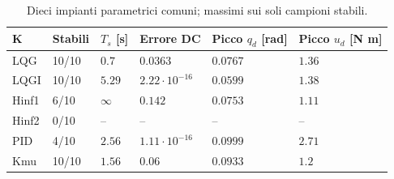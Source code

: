 \begin{table}[htbp]\centering\small
\begin{tabular}{llllll}\toprule
K & Stabili & $T_s$ [s] & Errore DC & Picco $q_d$ [rad] & Picco $u_d$ [N m]\\\midrule
LQG & 10/10 & $0.7$ & $0.0363$ & $0.0767$ & $1.36$\\
LQGI & 10/10 & $5.29$ & $2.22\cdot10^{-16}$ & $0.0599$ & $1.38$\\
Hinf1 & 6/10 & $\infty$ & $0.142$ & $0.0753$ & $1.11$\\
Hinf2 & 0/10 & -- & -- & -- & --\\
PID & 4/10 & $2.56$ & $1.11\cdot10^{-16}$ & $0.0999$ & $2.71$\\
Kmu & 10/10 & $1.56$ & $0.06$ & $0.0933$ & $1.2$\\
\bottomrule\end{tabular}
\caption{Dieci impianti parametrici comuni; massimi sui soli campioni stabili.}
\end{table}

